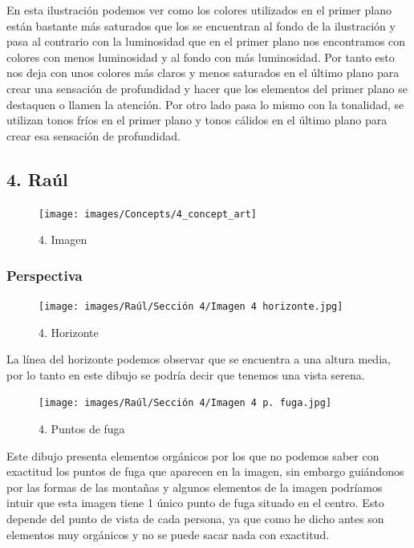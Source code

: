 \documentclass[12pt]{article}
\begin{document}
En esta ilustración podemos ver como los colores utilizados en el primer plano están bastante más saturados que los se encuentran al fondo de la ilustración y pasa al contrario con la luminosidad que en el primer plano nos encontramos con colores con menos luminosidad y al fondo con más luminosidad. Por tanto esto nos deja con unos colores más claros y menos saturados en el último plano para crear una sensación de profundidad y hacer que los elementos del primer plano se destaquen o llamen la atención. Por otro lado pasa lo mismo con la tonalidad, se utilizan tonos fríos en el primer plano y tonos cálidos en el último plano para crear esa sensación de profundidad.
        \newpage


    \subsection{4. Raúl}
    
    \begin{figure}[H]
      \centering
      \texttt{[image: images/Concepts/4\_concept\_art]}
      \caption{\small 4. Imagen}
\end{figure}

        \subsubsection{Perspectiva}
        
  \begin{figure}[H]
      \centering
      \texttt{[image: images/Raúl/Sección 4/Imagen 4 horizonte.jpg]}
      \caption{\small 4. Horizonte}
\end{figure}       

La línea del horizonte podemos observar que se encuentra a una altura media, por lo tanto en este dibujo se podría decir que tenemos una vista serena.

\begin{figure}[H]
      \centering
      \texttt{[image: images/Raúl/Sección 4/Imagen 4 p. fuga.jpg]}
      \caption{\small 4. Puntos de fuga}
\end{figure}  

Este dibujo presenta elementos orgánicos por los que no podemos saber con exactitud los puntos de fuga que aparecen en la imagen, sin embargo guiándonos por las formas de las montañas y algunos elementos de la imagen podríamos intuir que esta imagen tiene 1 único punto de fuga situado en el centro. Esto depende del punto de vista de cada persona, ya que como he dicho antes son elementos muy orgánicos y no se puede sacar nada con exactitud.
\end{document}
